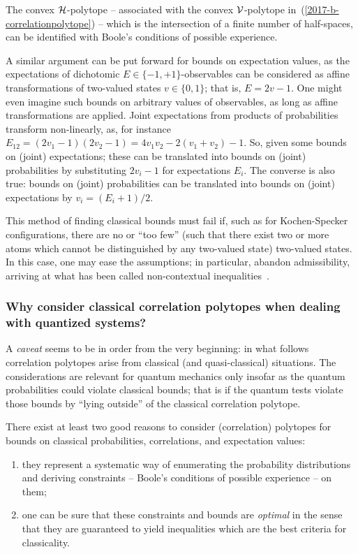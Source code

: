 The convex ${\cal H}$-polytope -- associated with the convex ${\cal V}$-polytope in~(\ref{2017-b-correlationpolytope}) --
which is the intersection of a finite number of half-spaces,  can be identified with Boole's conditions of possible
experience.


A similar argument can be put forward for bounds on expectation values, as
the expectations of dichotomic $E   \in \{-1,+1\}$-observables can be considered as affine transformations
of two-valued states $v  \in \{0,1\}$; that is, $E = 2 v - 1$.
One might even imagine such bounds on arbitrary values of observables, as long as affine transformations are applied.
Joint expectations from products of probabilities transform non-linearly, as,
for instance  $E_{12}= (2v_1-1)(2v_2-1)= 4 v_1v_2 - 2(v_1+v_2)-1$.
So, given some bounds on (joint) expectations; these can be translated into bounds on (joint) probabilities
by substituting $2 v_i - 1$ for expectations $E_i$.
The converse is also true:  bounds on (joint) probabilities can be translated into bounds on (joint)
expectations by $v_i = (E_i +1)/2$.

This method of finding classical bounds must fail if, such as for  Kochen-Specker configurations, there are no or ``too few''
(such that there exist two or more atoms which cannot be distinguished by any two-valued state)
two-valued states.
In this case, one may ease the assumptions; in particular, abandon admissibility, arriving at what has been called
non-contextual inequalities~\cite{cabello:210401}.



\subsubsection{Why consider classical correlation polytopes when dealing with quantized systems?}
\label{2017-b-wccp}

A {\em caveat} seems to be in order from the very beginning:
in what follows correlation polytopes arise from classical (and quasi-classical)
situations.
The considerations are relevant for quantum mechanics only insofar as the quantum probabilities could violate classical bounds;
that is if the quantum tests violate those bounds by ``lying outside'' of the classical correlation polytope.

There exist at least two good reasons to consider (correlation) polytopes for bounds on classical probabilities, correlations, and expectation values:
\begin{enumerate}
\item  they represent a systematic way of enumerating the probability distributions and deriving constraints --
Boole's conditions of possible experience -- on them;
\item   one can be sure that these constraints and bounds are {\em optimal} in the sense that they are guaranteed to yield inequalities which
are the best criteria for classicality.
\end{enumerate}

